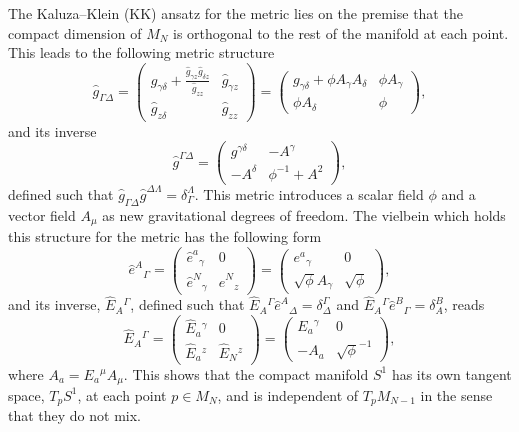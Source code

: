 \documentclass[aps,prd,12pt,superscriptaddress,showpacs,showkeys,reprint,nofootinbib]{revtex4-1}
\begin{document}
The Kaluza--Klein (KK) ansatz for the metric lies on the premise that the compact dimension of $M_N$ is orthogonal to the rest of the manifold at each point. This leads to the following metric structure
\begin{equation}
  \hat{g}_{\Gamma\Delta} =
  \begin{pmatrix}
    g_{\gamma\delta} +\frac{\hat{g}_{\gamma z}\hat{g}_{\delta z}}{\hat{g}_{zz}}&\hat{g}_{\gamma z}\\
    \hat{g}_{z\delta} & \hat{g}_{zz}
  \end{pmatrix}
  =
  \begin{pmatrix}
    g_{\gamma\delta} + \phi A_\gamma A_\delta&\phi A_\gamma\\
    \phi A_{\delta} & \phi
  \end{pmatrix},
\end{equation}
and its inverse
\begin{equation}
  \hat{g}^{\Gamma\Delta}=
  \begin{pmatrix}
    g^{\gamma\delta}&-A^\gamma\\
    -A^{\delta} & \phi^{-1}+A^2
  \end{pmatrix},
\end{equation}
defined such that $\hat{g}_{\Gamma\Delta}\hat{g}^{\Delta\Lambda}=\delta^\Lambda_\Gamma$. This metric introduces a scalar field $\phi$ and a vector field $A_\mu$ as new gravitational degrees of freedom. The vielbein which holds this structure for the metric has the following form
\begin{equation}
  \label{Dvielbein}
  \hat{e}^A{}_{\Gamma} =
  \begin{pmatrix}
    \hat{e}^a{}_{\gamma}& 0\\
    \hat{e}^N{}_{\gamma} & \hat{e}^N{}_{z}
  \end{pmatrix}
  =
  \begin{pmatrix}
    e^a{}_{\gamma}& 0\\
    \sqrt{\phi}A_\gamma & \sqrt{\phi}
  \end{pmatrix},
\end{equation}
and its inverse, $\hat{E}_A{}^{\Gamma}$, defined such that $\hat{E}_A{}^{\Gamma}\hat{e}^A{}_{\Delta}=\delta^\Gamma_{\Delta}$ and $\hat{E}_A{}^{\Gamma}\hat{e}^B{}_{\Gamma}=\delta^B_A$, reads
\begin{equation}
  \label{Dinversevielbein}
  \hat{E}_A{}^{\Gamma} =
  \begin{pmatrix}
    \hat{E}_a{}^{\gamma}& 0\\
    \hat{E}_a{}^{z} & \hat{E}_N{}^{z}
  \end{pmatrix}
  =
  \begin{pmatrix}
    E_a{}^{\gamma}& 0\\
    -A_a & \sqrt{\phi}^{-1}
  \end{pmatrix},
\end{equation}
where $A_a = E_a{}^\mu A_\mu$. This shows that the compact manifold $S^1$ has its own tangent space, $T_pS^1$, at each point $p\in M_N$, and is independent of $T_pM_{N-1}$ in the sense that they do not mix. %
\end{document}
